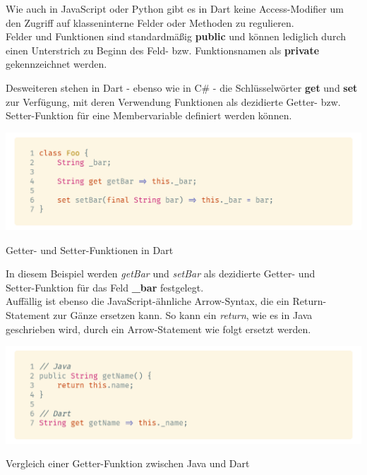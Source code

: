 Wie auch in JavaScript oder Python gibt es in Dart keine Access-Modifier um den Zugriff
auf klasseninterne Felder oder Methoden zu regulieren.\\
Felder und Funktionen sind standardmäßig \textbf{public} und können lediglich durch
einen Unterstrich zu Beginn des Feld- bzw. Funktionsnamen als \textbf{private} gekennzeichnet
werden.

Desweiteren stehen in Dart - ebenso wie in C\# - die Schlüsselwörter \textbf{get} und 
\textbf{set} zur Verfügung, mit deren Verwendung Funktionen als dezidierte Getter- bzw.
Setter-Funktion für eine Membervariable definiert werden können.

\begin{code}
    \centering
    \includegraphics[width=1\textwidth]{images/Dart/theory/dartGetterSetter.png}
    \caption{Getter- und Setter-Funktionen in Dart}
\end{code}

In diesem Beispiel werden \textit{getBar} und \textit{setBar} als dezidierte Getter- und\\
Setter-Funktion für das Feld \textbf{\_bar} festgelegt.\\
Auffällig ist ebenso die JavaScript-ähnliche Arrow-Syntax, die ein Return-Statement
zur Gänze ersetzen kann.
So kann ein \textit{return}, wie es in Java geschrieben wird, durch ein Arrow-Statement wie folgt
ersetzt werden.

\begin{code}
    \centering
    \includegraphics[width=1\textwidth]{images/Dart/theory/dartVSJavaGetter.png}
    \caption{Vergleich einer Getter-Funktion zwischen Java und Dart}
\end{code}

\newpage

